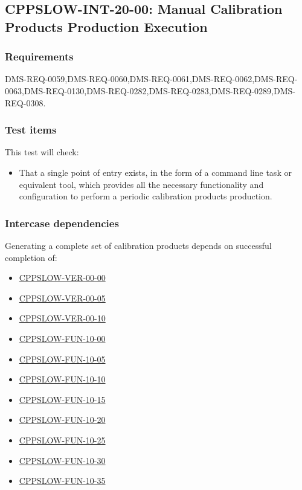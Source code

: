 \subsection{CPPSLOW-INT-20-00: Manual Calibration Products Production Execution}
\label{cppslow-int-20-00}

\subsubsection{Requirements}

DMS-REQ-0059,DMS-REQ-0060,DMS-REQ-0061,DMS-REQ-0062,DMS-REQ-0063,DMS-REQ-0130,DMS-REQ-0282,DMS-REQ-0283,DMS-REQ-0289,DMS-REQ-0308.

\subsubsection{Test items}

This test will check:

\begin{itemize}

  \item{That a single point of entry exists, in the form of a command line
  task or equivalent tool, which provides all the necessary functionality and
  configuration to perform a periodic calibration products production.}

\end{itemize}

\subsubsection{Intercase dependencies}

Generating a complete set of calibration products depends on successful
completion of:

\begin{itemize}

  \item{\hyperref[cppslow-ver-00-00]{CPPSLOW-VER-00-00}}
  \item{\hyperref[cppslow-ver-00-05]{CPPSLOW-VER-00-05}}
  \item{\hyperref[cppslow-ver-00-10]{CPPSLOW-VER-00-10}}
  \item{\hyperref[cppslow-fun-10-00]{CPPSLOW-FUN-10-00}}
  \item{\hyperref[cppslow-fun-10-05]{CPPSLOW-FUN-10-05}}
  \item{\hyperref[cppslow-fun-10-10]{CPPSLOW-FUN-10-10}}
  \item{\hyperref[cppslow-fun-10-15]{CPPSLOW-FUN-10-15}}
  \item{\hyperref[cppslow-fun-10-20]{CPPSLOW-FUN-10-20}}
  \item{\hyperref[cppslow-fun-10-25]{CPPSLOW-FUN-10-25}}
  \item{\hyperref[cppslow-fun-10-30]{CPPSLOW-FUN-10-30}}
  \item{\hyperref[cppslow-fun-10-35]{CPPSLOW-FUN-10-35}}

\end{itemize}

